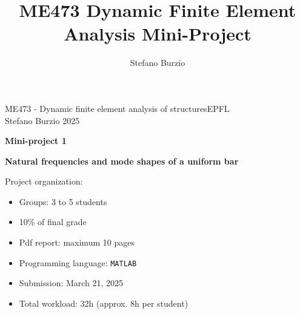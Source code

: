 \documentclass[12pt]{article}
\title{ME473 Dynamic Finite Element Analysis Mini-Project}
\author{Stefano Burzio}
\date{}
\begin{document}
\noindent ME473 - Dynamic finite element analysis of structures\hfill EPFL\\
Stefano Burzio \hfill 2025\\
\vspace{0.3cm}

\hspace*{\fill}\textbf{\Large Mini-project 1}\hspace*{\fill}
\begin{center}
  \textbf{\Large Natural frequencies and mode shapes of a uniform bar}
\end{center}

\hrulefill
\vspace{0.3cm}
\newline
{Project organization:}
\vspace{0.2cm}
\newline
\begin{minipage}[t]{0.38\textwidth}
  \begin{itemize}[itemsep=0.005cm]
    \item Groups: 3 to 5 students
    \item 10\% of final grade
    \item Pdf report: maximum 10 pages
  \end{itemize}
\end{minipage}
\hfill
\begin{minipage}[t]{0.58\textwidth}
  \begin{itemize}[itemsep=0.005cm]
    \item Programming language: \texttt{MATLAB}
    \item Submission: March 21, 2025
    \item Total workload:  32h (approx. 8h per student)
  \end{itemize}
\end{minipage}
\vspace{0.3cm}

\hrulefill
\vspace{0.3cm}
\end{document}
